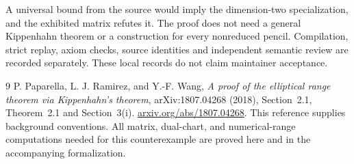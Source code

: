\documentclass[10pt,letterpaper]{article}
\begin{document}
A universal bound from the source would imply the dimension-two specialization, and the exhibited matrix refutes it. The proof does not need a general Kippenhahn theorem or a construction for every nonreduced pencil. Compilation, strict replay, axiom checks, source identities and independent semantic review are recorded separately. These local records do not claim maintainer acceptance.

\begin{thebibliography}{9}
P. Paparella, L. J. Ramirez, and Y.-F. Wang,
\emph{A proof of the elliptical range theorem via Kippenhahn's theorem},
arXiv:1807.04268 (2018), Section~2.1, Theorem~2.1 and Section~3(i).
\href{https://arxiv.org/abs/1807.04268}{arxiv.org/abs/1807.04268}.
This reference supplies background conventions. All matrix, dual-chart, and numerical-range computations needed for this counterexample are proved here and in the accompanying formalization.
\end{thebibliography}
\end{document}
